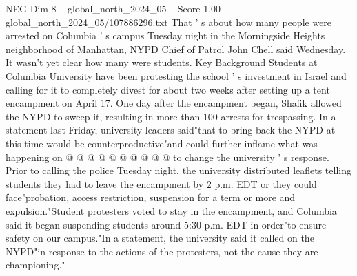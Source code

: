 \begin{textsample}{NEG Dim 8 – global\_north\_2024\_05 – Score 1.00 – global\_north\_2024\_05/107886296.txt}
That ' s about how many people were arrested on Columbia ' s campus Tuesday night in the Morningside Heights neighborhood of Manhattan, NYPD Chief of Patrol John Chell said Wednesday.
It wasn't yet clear how many were students.
Key Background Students at Columbia University have been protesting the school ' s investment in Israel and calling for it to completely divest for about two weeks after setting up a tent encampment on April 17.
One day after the encampment began, Shafik allowed the NYPD to sweep it, resulting in more than 100 arrests for trespassing.
In a statement last Friday, university leaders said"that to bring back the NYPD at this time would be counterproductive"and could further inflame what was happening on @ @ @ @ @ @ @ @ @ @ to change the university ' s response.
Prior to calling the police Tuesday night, the university distributed leaflets telling students they had to leave the encampment by 2 p.m.
EDT or they could face"probation, access restriction, suspension for a term or more and expulsion."Student protesters voted to stay in the encampment, and Columbia said it began suspending students around 5:30 p.m.
EDT in order"to ensure safety on our campus."In a statement, the university said it called on the NYPD"in response to the actions of the protesters, not the cause they are championing."

\end{textsample}
